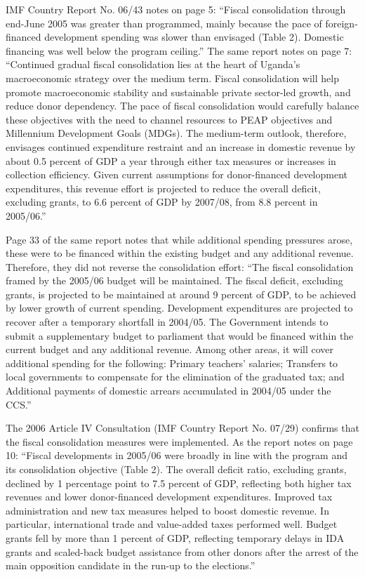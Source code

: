 IMF Country Report No. 06/43 notes on page 5: “Fiscal consolidation through end-June 2005 was greater than programmed, mainly because the pace of foreign-financed development spending was slower than envisaged (Table 2). Domestic financing was well below the program ceiling.” The same report notes on page 7: “Continued gradual fiscal consolidation lies at the heart of Uganda’s macroeconomic strategy over the medium term. Fiscal consolidation will help promote macroeconomic stability and sustainable private sector-led growth, and reduce donor dependency. The pace of fiscal consolidation would carefully balance these objectives with the need to channel resources to PEAP objectives and Millennium Development Goals (MDGs). The medium-term outlook, therefore, envisages continued expenditure restraint and an increase in domestic revenue by about 0.5 percent of GDP a year through either tax measures or increases in collection efficiency. Given current assumptions for donor-financed development expenditures, this revenue effort is projected to reduce the overall deficit, excluding grants, to 6.6 percent of GDP by 2007/08, from 8.8 percent in 2005/06.”

Page 33 of the same report notes that while additional spending pressures arose, these were to be financed within the existing budget and any additional revenue. Therefore, they did not reverse the consolidation effort: “The fiscal consolidation framed by the 2005/06 budget will be maintained. The fiscal deficit, excluding grants, is projected to be maintained at around 9 percent of GDP, to be achieved by lower growth of current spending. Development expenditures are projected to recover after a temporary shortfall in 2004/05. The Government intends to submit a supplementary budget to parliament that would be financed within the current budget and any additional revenue. Among other areas, it will cover additional spending for the following: Primary teachers’ salaries; Transfers to local governments to compensate for the elimination of the graduated tax; and Additional payments of domestic arrears accumulated in 2004/05 under the CCS.”

The 2006 Article IV Consultation (IMF Country Report No. 07/29) confirms that the fiscal consolidation measures were implemented. As the report notes on page 10: “Fiscal developments in 2005/06 were broadly in line with the program and its consolidation objective (Table 2). The overall deficit ratio, excluding grants, declined by 1 percentage point to 7.5 percent of GDP, reflecting both higher tax revenues and lower donor-financed development expenditures. Improved tax administration and new tax measures helped to boost domestic revenue. In particular, international trade and value-added taxes performed well. Budget grants fell by more than 1 percent of GDP, reflecting temporary delays in IDA grants and scaled-back budget assistance from other donors after the arrest of the main opposition candidate in the run-up to the elections.”

